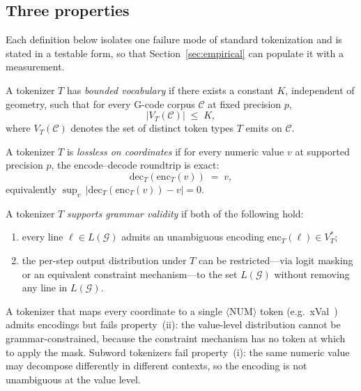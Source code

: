 \documentclass[sensors,article,submit,moreauthors,pdftex]{Definitions/mdpi}
\begin{document}
\subsection{Three properties}
\label{sec:three_properties}

Each definition below isolates one failure mode of standard tokenization and is stated in a testable form, so that Section~\ref{sec:empirical} can populate it with a measurement.

\begin{Definition}
\label{def:bounded}
A tokenizer $T$ has \emph{bounded vocabulary} if there exists a constant $K$, independent of geometry, such that for every G-code corpus $\mathcal{C}$ at fixed precision $p$,
\[
    |V_T(\mathcal{C})| \;\le\; K,
\]
where $V_T(\mathcal{C})$ denotes the set of distinct token types $T$ emits on $\mathcal{C}$.
\end{Definition}

\begin{Definition}
\label{def:lossless}
A tokenizer $T$ is \emph{lossless on coordinates} if for every numeric value $v$ at supported precision $p$, the encode--decode roundtrip is exact:
\[
    \mathrm{dec}_T(\mathrm{enc}_T(v)) \;=\; v,
\]
equivalently $\sup_{v}\, |\mathrm{dec}_T(\mathrm{enc}_T(v)) - v| = 0$.
\end{Definition}

\begin{Definition}
\label{def:grammar_valid}
A tokenizer $T$ \emph{supports grammar validity} if both of the following hold:
\begin{enumerate}[leftmargin=*, label=(\roman*)]
    \item every line $\ell \in L(\mathcal{G})$ admits an unambiguous encoding $\mathrm{enc}_T(\ell) \in V_T^{\ast}$;
    \item the per-step output distribution under $T$ can be restricted---via logit masking or an equivalent constraint mechanism---to the set $L(\mathcal{G})$ without removing any line in $L(\mathcal{G})$.
\end{enumerate}
\end{Definition}

A tokenizer that maps every coordinate to a single $\langle\mathrm{NUM}\rangle$ token (e.g.\ xVal~\cite{xval}) admits encodings but fails property~(ii): the value-level distribution cannot be grammar-constrained, because the constraint mechanism has no token at which to apply the mask. Subword tokenizers fail property~(i): the same numeric value may decompose differently in different contexts, so the encoding is not unambiguous at the value level.
\end{document}

